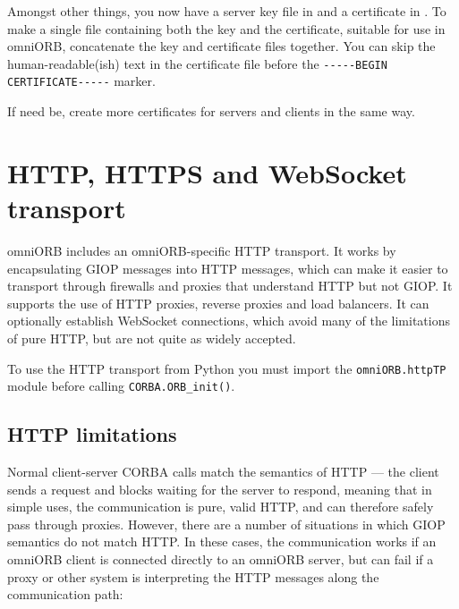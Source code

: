 \documentclass[11pt,oneside,a4paper]{book}
\newcommand{\code}[1]{\texttt{#1}}
\newcommand{\op}[1]{\texttt{#1()}}
\begin{document}
\noindent Amongst other things, you now have a server key file in
 and a certificate in . To
make a single file containing both the key and the certificate,
suitable for use in omniORB, concatenate the key and certificate files
together.  You can skip the human-readable(ish) text in the
certificate file before the \verb|-----BEGIN CERTIFICATE-----| marker.

If need be, create more certificates for servers and clients in the
same way.


\section{HTTP, HTTPS and WebSocket transport}
\label{sec:httptransport}

omniORB includes an omniORB-specific HTTP transport. It works by
encapsulating GIOP messages into HTTP messages, which can make it
easier to transport through firewalls and proxies that understand HTTP
but not GIOP. It supports the use of HTTP proxies, reverse proxies and
load balancers. It can optionally establish WebSocket connections,
which avoid many of the limitations of pure HTTP, but are not quite as
widely accepted.

To use the HTTP transport from Python you must import the
\code{omniORB.httpTP} module before calling \op{CORBA.ORB\_init}.

\subsection{HTTP limitations}

Normal client-server CORBA calls match the semantics of HTTP --- the
client sends a request and blocks waiting for the server to respond,
meaning that in simple uses, the communication is pure, valid HTTP,
and can therefore safely pass through proxies. However, there are a
number of situations in which GIOP semantics do not match HTTP. In
these cases, the communication works if an omniORB client is connected
directly to an omniORB server, but can fail if a proxy or other system
is interpreting the HTTP messages along the communication path:
\end{document}
